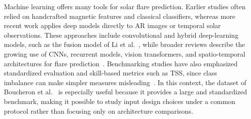 \documentclass[runningheads]{llncs}
\begin{document}

Machine learning offers many tools for solar flare prediction. Earlier studies often relied on handcrafted magnetic features and classical classifiers, whereas more recent work applies deep models directly to AR images or temporal solar observations. These approaches include convolutional and hybrid deep-learning models, such as the fusion model of Li et al.~\cite{ref_li_flares}, while broader reviews describe the growing use of CNNs, recurrent models, vision transformers, and spatio-temporal architectures for flare prediction~\cite{ref_shao_review}. Benchmarking studies have also emphasized standardized evaluation and skill-based metrics such as TSS, since class imbalance can make simpler measures misleading~\cite{ref_bloomfield}. In this context, the dataset of Boucheron et al.~\cite{ref_boucheron} is especially useful because it provides a large and standardized benchmark, making it possible to study input design choices under a common protocol rather than focusing only on architecture comparisons.


\end{document}
